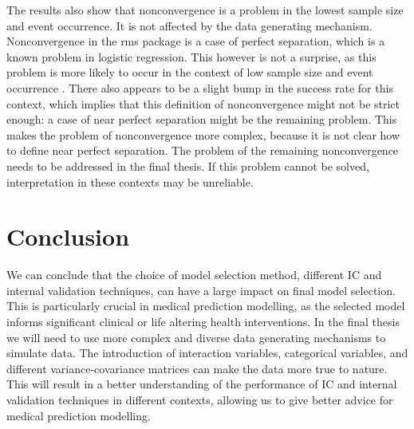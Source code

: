 \documentclass[AMA,STIX1COL]{WileyNJD-v5}
\begin{document}
The results also show that nonconvergence is a problem in the lowest
sample size and event occurrence. It is not affected by the data
generating mechanism. Nonconvergence in the rms package is a case of
perfect separation, which is a known problem in logistic regression.
This however is not a surprise, as this problem is more likely to occur
in the context of low sample size and event occurrence
\citep{vansmedenNoRationaleVariable2016}. There also appears to be a
slight bump in the success rate for this context, which implies that
this definition of nonconvergence might not be strict enough: a case of
near perfect separation might be the remaining problem. This makes the
problem of nonconvergence more complex, because it is not clear how to
define near perfect separation. The problem of the remaining
nonconvergence needs to be addressed in the final thesis. If this
problem cannot be solved, interpretation in these contexts may be
unreliable.

\hypertarget{sec6}{%
\section{Conclusion}\label{sec6}}

We can conclude that the choice of model selection method, different IC
and internal validation techniques, can have a large impact on final
model selection. This is particularly crucial in medical prediction
modelling, as the selected model informs significant clinical or life
altering health interventions. In the final thesis we will need to use
more complex and diverse data generating mechanisms to simulate data.
The introduction of interaction variables, categorical variables, and
different variance-covariance matrices can make the data more true to
nature. This will result in a better understanding of the performance of
IC and internal validation techniques in different contexts, allowing us
to give better advice for medical prediction modelling.


\end{document}
